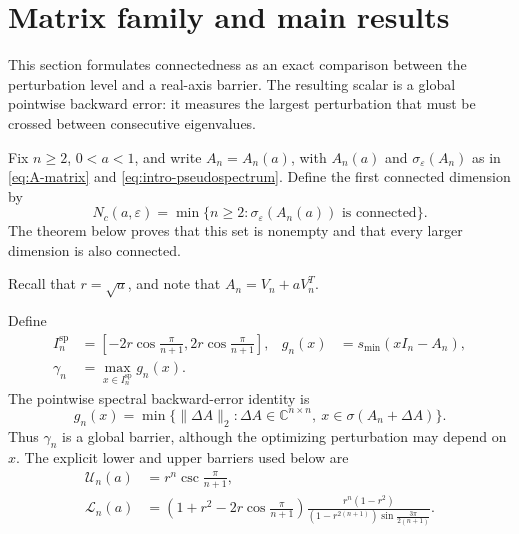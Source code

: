 \documentclass[a4paper,preprint,12pt,nopreprintline,sort&compress]{elsarticle}
\numberwithin{equation}{section}
\theoremstyle{remark}
\newcommand{\C}{\mathbb C}
\begin{document}
\section{Matrix family and main results}\label{sec:main-results}

This section formulates connectedness as an exact comparison between the
perturbation level and a real-axis barrier.  The resulting scalar is a
global pointwise backward error: it measures the largest perturbation that
must be crossed between consecutive eigenvalues.

Fix \(n\geq2\), \(0<a<1\), and write \(A_n=A_n(a)\), with \(A_n(a)\)
and \(\sigma_\varepsilon(A_n)\) as in
\eqref{eq:A-matrix} and \eqref{eq:intro-pseudospectrum}.  Define the first
connected dimension by
\[
 N_c(a,\varepsilon)=\min\{n\geq2:
 \sigma_\varepsilon(A_n(a))\text{ is connected}\}.
\]
The theorem below proves that this set is nonempty and that every larger
dimension is also connected.

Recall that \(r=\sqrt a\), and note that \(A_n=V_n+aV_n^T\).

Define
\[
 \begin{aligned}
 I_n^{\mathrm{sp}}
 &=\left[-2r\cos\frac{\pi}{n+1},2r\cos\frac{\pi}{n+1}\right],
 &g_n(x)&=s_{\min}(xI_n-A_n),\\
 \gamma_n&=\max_{x\in I_n^{\mathrm{sp}}}g_n(x).
 \end{aligned}
\]
The pointwise spectral backward-error identity is
\begin{equation}\label{eq:backward-error-main}
 g_n(x)=
 \min\bigl\{\lVert\Delta A\rVert_2:
 \Delta A\in\C^{n\times n},\
 x\in\sigma(A_n+\Delta A)\bigr\}.
\end{equation}
Thus \(\gamma_n\) is a global barrier, although the optimizing perturbation
may depend on \(x\).
The explicit lower and upper barriers used below are
\begin{align}
 \mathcal U_n(a)&=r^n\csc\frac{\pi}{n+1},\label{eq:main-U-def}\\
 \mathcal L_n(a)&=
 \left(1+r^2-2r\cos\frac{\pi}{n+1}\right)
 \frac{r^n(1-r^2)}
 {(1-r^{2(n+1)})\sin\frac{3\pi}{2(n+1)}}.\label{eq:main-L-def}
\end{align}
\end{document}
